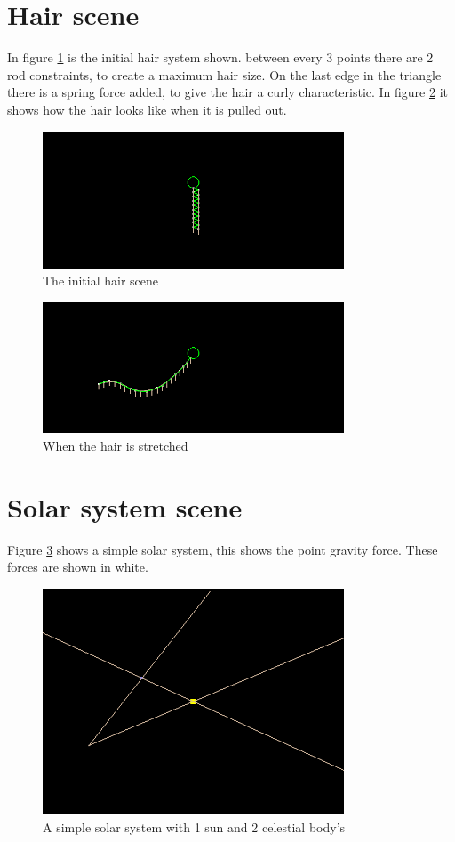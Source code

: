 \section{Hair scene}

In figure \ref{fig:HairInit} is the initial hair system shown. between every 3 points there are 2 rod constraints, to create a maximum hair size. On the last edge in the triangle there is a spring force added, to give the hair a curly characteristic. In figure \ref{fig:Hair} it shows how the hair looks like when it is pulled out.

\begin{figure}[htb!]
    \centering
    \includegraphics[width=0.8\textwidth]{images/HairInit}
    \caption{The initial hair scene}
    \label{fig:HairInit}
\end{figure} 
\begin{figure}[htb!]
    \centering
    \includegraphics[width=0.8\textwidth]{images/Hair}
    \caption{When the hair is stretched}
    \label{fig:Hair}
\end{figure} 

\section{Solar system scene}

Figure \ref{fig:Solar} shows a simple solar system, this shows the point gravity force. These forces are shown in white. 

\begin{figure}[htb!]
    \centering
    \includegraphics[width=0.8\textwidth]{images/Solar}
    \caption{A simple solar system with 1 sun and 2 celestial body's}
    \label{fig:Solar}
\end{figure} 

